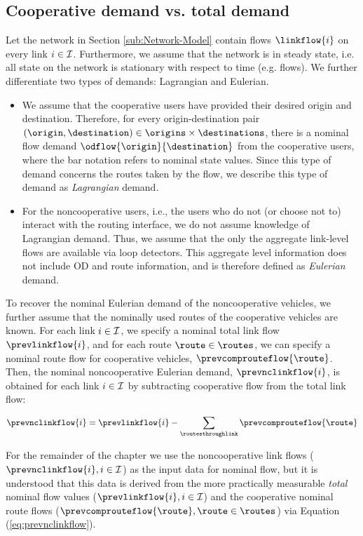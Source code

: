 \subsection{Cooperative demand vs. total demand}

Let the network in Section \ref{sub:Network-Model} contain flows
$\linkflow{\link}$ on every link $i\in\mathcal{I}$. Furthermore,
we assume that the network is in steady state, i.e. all state on the
network is stationary with respect to time (e.g. flows). We further
differentiate two types of demands: Lagrangian and Eulerian.
\begin{itemize}
\item We assume that the cooperative users have provided their desired origin
and destination. Therefore, for every origin-destination pair $\left(\origin,\destination\right)\in\origins\times\destinations$,
there is a nominal flow demand $\odflow{\origin}{\destination}$ from
the cooperative users, where the bar notation refers to nominal state
values. Since this type of demand concerns the routes taken by the
flow, we describe this type of demand as \emph{Lagrangian }demand\emph{.}
\item For the noncooperative users, i.e., the users who do not (or choose
not to) interact with the routing interface, we do not assume knowledge
of Lagrangian demand. Thus, we assume that the only the aggregate
link-level flows are available via loop detectors. This aggregate
level information does not include OD and route information, and is
therefore defined as \emph{Eulerian} demand.
\end{itemize}
To recover the nominal Eulerian demand of the noncooperative vehicles,
we further assume that the nominally used routes of the cooperative
vehicles are known. For each link $i\in\mathcal{I}$, we specify a
nominal total link flow $\prevlinkflow{\link}$, and for each route
$\route\in\routes$, we can specify a nominal route flow for cooperative
vehicles, $\prevcomprouteflow{\route}$. Then, the nominal noncooperative
Eulerian demand, $\prevnclinkflow{\link}$, is obtained for each link
$i\in\mathcal{I}$ by subtracting cooperative flow from the total link
flow: 

\begin{equation}
\prevnclinkflow{\link}=\prevlinkflow{\link}-\sum_{\routesthroughlink}\prevcomprouteflow{\route}\label{eq:prevnclinkflow}
\end{equation}


For the remainder of the chapter we use the noncooperative link flows
($\prevnclinkflow{\link},\link\in\links$) as the input data for nominal
flow, but it is understood that this data is derived from the more
practically measurable \emph{total }nominal flow values ($\prevlinkflow{\link},\link\in\links$)
and the cooperative nominal route flows ($\prevcomprouteflow{\route},\route\in\routes$)
via Equation (\ref{eq:prevnclinkflow}). 

